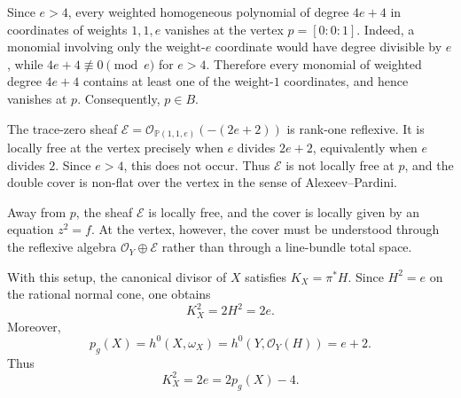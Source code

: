 \documentclass[11pt,twoside]{amsart}
\theoremstyle{plain}
\numberwithin{equation}{section}
\theoremstyle{definition}
\begin{document}
Since $e>4$, every weighted homogeneous polynomial of degree $4e+4$ in coordinates of weights $1,1,e$ vanishes at the vertex $p=[0:0:1]$. Indeed, a monomial involving only the weight-$e$ coordinate would have degree divisible by $e$, while $4e+4\not\equiv 0\pmod e$ for $e>4$. Therefore every monomial of weighted degree $4e+4$ contains at least one of the weight-$1$ coordinates, and hence vanishes at $p$. Consequently, $p\in B$.

The trace-zero sheaf $\mathcal{E}=\mathcal{O}_{\mathbb{P}(1,1,e)}(-(2e+2))$ is rank-one reflexive. It is locally free at the vertex precisely when $e$ divides $2e+2$, equivalently when $e$ divides $2$. Since $e>4$, this does not occur. Thus $\mathcal{E}$ is not locally free at $p$, and the double cover is non-flat over the vertex in the sense of Alexeev--Pardini.

Away from $p$, the sheaf $\mathcal{E}$ is locally free, and the cover is locally given by an equation $z^2=f$. At the vertex, however, the cover must be understood through the reflexive algebra $\mathcal{O}_{Y}\oplus\mathcal{E}$ rather than through a line-bundle total space.

With this setup, the canonical divisor of $X$ satisfies $K_{X}=\pi^*H$. Since $H^2=e$ on the rational normal cone, one obtains
$$
K_{X}^2=2H^2=2e.
$$
Moreover,
$$
p_g(X)=h^0(X,\omega_{X})=h^0(Y,\mathcal{O}_{Y}(H))=e+2.
$$
Thus
$$
K_{X}^2=2e=2p_g(X)-4.
$$
\end{document}
